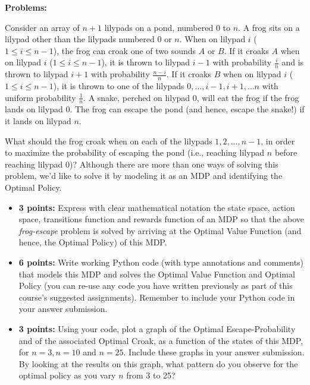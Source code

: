 \documentclass[12pt]{exam}
\begin{document}
{\large{\bf Problems:}}
\begin{questions}
 Consider an array of $n+1$ lilypads on a pond, numbered $0$ to $n$. A frog sits on a lilypad other than the lilypads numbered $0$ or $n$.  When on lilypad $i$ ($1\leq i \leq n-1$), the frog can croak one of two sounds $A$ or 
$B$. If it croaks $A$ when on lilypad $i$ ($1 \leq i \leq n-1$), it is thrown to lilypad $i-1$ with probability $\frac i n$ and is thrown to lilypad $i+1$ with probability $\frac {n-i} n$. If it croaks $B$ when on lilypad $i$ ($1\leq i \leq n-1$), it is thrown to one of the lilypads $0, \ldots, i-1, i+1, \ldots n$ with uniform probability $\frac 1 n$. A snake, perched on lilypad $0$, will eat the frog if the frog lands on lilypad $0$. The frog can escape the pond (and hence, escape the snake!) if it lands on lilypad $n$.

What should the frog croak when on each of the lilypads $1, 2, \ldots, n-1$, in order to maximize the probability of escaping the pond (i.e., reaching lilypad $n$ before reaching lilypad $0$)? Although there are more than one ways of solving this problem, we'd like to solve it by modeling it as an MDP and identifying the Optimal Policy.

\begin{itemize}
\item {\bf 3 points:} Express with clear mathematical notation the state space, action space, transitions function and rewards function of an MDP so that the above {\em frog-escape} problem is solved by arriving at the Optimal Value Function (and hence, the Optimal Policy) of this MDP.
\item {\bf 6 points:} Write working Python code (with type annotations and comments) that models this MDP and solves the Optimal Value Function and Optimal Policy (you can re-use any code you have written previously as part of this course's suggested assignments). Remember to include your Python code in your answer submission.
\item {\bf 3 points:} Using your code, plot a graph of the Optimal Escape-Probability and of the associated Optimal Croak, as a function of the states of this MDP, for $n=3, n=10$ and $n=25$. Include these graphs in your answer submission. By looking at the results on this graph, what pattern do you observe for the optimal policy as you vary $n$ from 3 to 25? 
\end{itemize}

\pagebreak


\end{questions}
\end{document}
